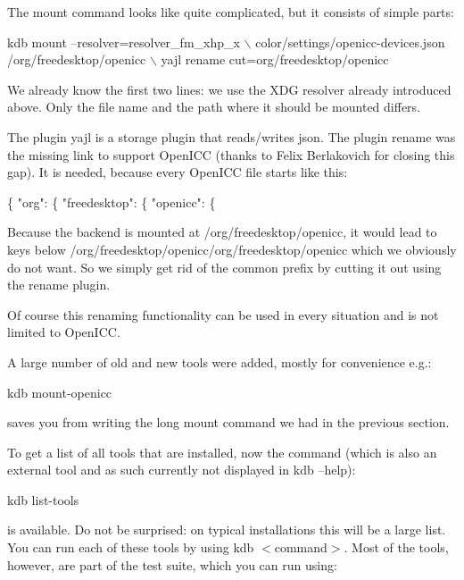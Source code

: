 The mount command looks like quite complicated, but it consists of simple parts\+:


\begin{DoxyCode}
kdb mount --resolver=resolver\_fm\_xhp\_x \(\backslash\)
  color/settings/openicc-devices.json /org/freedesktop/openicc \(\backslash\)
  yajl rename cut=org/freedesktop/openicc
\end{DoxyCode}


We already know the first two lines\+: we use the X\+DG resolver already introduced above. Only the file name and the path where it should be mounted differs.

The plugin yajl is a storage plugin that reads/writes json. The plugin rename was the missing link to support Open\+I\+CC (thanks to Felix Berlakovich for closing this gap). It is needed, because every Open\+I\+CC file starts like this\+:


\begin{DoxyCode}
\{ "org": \{ "freedesktop": \{ "openicc": \{
\end{DoxyCode}


Because the backend is mounted at /org/freedesktop/openicc, it would lead to keys below /org/freedesktop/openicc/org/freedesktop/openicc which we obviously do not want. So we simply get rid of the common prefix by cutting it out using the rename plugin.

Of course this renaming functionality can be used in every situation and is not limited to Open\+I\+CC.

A large number of old and new tools were added, mostly for convenience e.\+g.\+:


\begin{DoxyCode}
kdb mount-openicc
\end{DoxyCode}


saves you from writing the long mount command we had in the previous section.

To get a list of all tools that are installed, now the command (which is also an external tool and as such currently not displayed in kdb --help)\+:


\begin{DoxyCode}
kdb list-tools
\end{DoxyCode}


is available. Do not be surprised\+: on typical installations this will be a large list. You can run each of these tools by using kdb $<$command$>$. Most of the tools, however, are part of the test suite, which you can run using\+:


